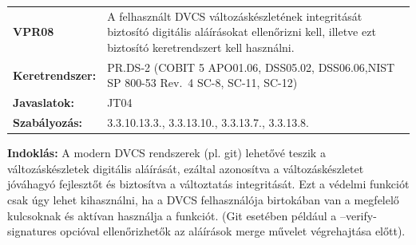 \documentclass[12pt,magyar,a4paper,oneside]{scrreprt}
\begin{document}
\begin{longtable}[]{@{}ll@{}}
\toprule
\endhead
\begin{minipage}[t]{0.16\columnwidth}\raggedright
\textbf{VPR08}\strut
\end{minipage} & \begin{minipage}[t]{0.79\columnwidth}\raggedright
A felhasznált DVCS változáskészletének integritását biztosító digitális
aláírásokat ellenőrizni kell, illetve ezt biztosító keretrendszert kell
használni.\strut
\end{minipage}\tabularnewline
\begin{minipage}[t]{0.16\columnwidth}\raggedright
\textbf{Keretrendszer:}\strut
\end{minipage} & \begin{minipage}[t]{0.79\columnwidth}\raggedright
PR.DS-2 (COBIT 5 APO01.06, DSS05.02, DSS06.06,NIST SP 800-53 Rev.~4
SC-8, SC-11, SC-12)\strut
\end{minipage}\tabularnewline
\begin{minipage}[t]{0.16\columnwidth}\raggedright
\textbf{Javaslatok:}\strut
\end{minipage} & \begin{minipage}[t]{0.79\columnwidth}\raggedright
JT04\strut
\end{minipage}\tabularnewline
\begin{minipage}[t]{0.16\columnwidth}\raggedright
\textbf{Szabályozás:}\strut
\end{minipage} & \begin{minipage}[t]{0.79\columnwidth}\raggedright
3.3.10.13.3., 3.3.13.10., 3.3.13.7., 3.3.13.8.\strut
\end{minipage}\tabularnewline
\bottomrule
\end{longtable}

\textbf{Indoklás: } A modern DVCS rendszerek (pl. git) lehetővé teszik a
változáskészletek digitális aláírását, ezáltal azonosítva a
változáskészletet jóváhagyó fejlesztőt és biztosítva a változtatás
integritását. Ezt a védelmi funkciót csak úgy lehet kihasználni, ha a
DVCS felhasználója birtokában van a megfelelő kulcsoknak és aktívan
használja a funkciót. (Git esetében például a --verify-signatures
opcióval ellenőrizhetők az aláírások merge művelet végrehajtása előtt).
\end{document}
